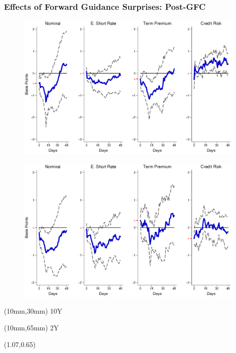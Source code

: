 \documentclass[12pt, aspectratio=169, xcolor=dvipsnames]{beamer}
\begin{document}
\begin{frame}[label=FGEMpost]
\frametitle{Effects of Forward Guidance Surprises: Post-GFC}
\begin{figure}[!htbp]
\begin{center} %
\includegraphics[trim={0cm 0cm 0cm 0cm},clip,height=0.45\textheight,width=0.85\linewidth]{../Figures/LPs/LagDep-FX/Path/EM/PathEMnomyptpphi120mPost.eps}
\par\end{center}
\end{figure}
\vspace{-0.5cm}
\begin{figure}[!htbp]
\begin{center} %
\includegraphics[trim={0cm 0cm 0cm 0.76cm},clip,height=0.45\textheight,width=0.85\linewidth]{../Figures/LPs/LagDep-FX/Path/EM/PathEMnomyptpphi24mPost.eps}
\par\end{center}
\end{figure}
\begin{textblock*}{8mm}(10mm,30mm)
\small 10Y
\end{textblock*}
\begin{textblock*}{8mm}(10mm,65mm)
\small 2Y
\end{textblock*}
\begin{textblock*}{5cm}(1.07\textwidth,0.65\textheight)
\hyperlink{FGUSpost}{}
\end{textblock*}
\end{frame}
\end{document}
